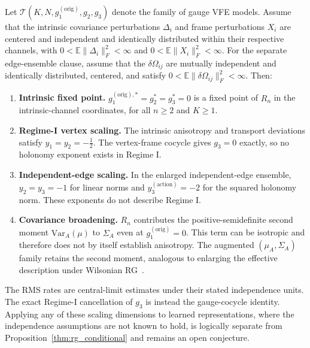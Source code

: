 \documentclass[twoside,11pt]{article}
\begin{document}
\begin{proposition}
\label{thm:rg_conditional}
Let $\mathcal{T}(K, N, g_1^{(\mathrm{orig})}, g_2, g_3)$ denote the family of gauge VFE models. Assume that the intrinsic covariance perturbations $\Delta_i$ and frame perturbations $X_i$ are centered and independent and identically distributed within their respective channels, with $0<\mathbb{E}\|\Delta_i\|_F^2<\infty$ and $0<\mathbb{E}\|X_i\|_F^2<\infty$. For the separate edge-ensemble clause, assume that the $\delta\Omega_{ij}$ are mutually independent and identically distributed, centered, and satisfy $0<\mathbb{E}\|\delta\Omega_{ij}\|_F^2<\infty$. Then:
\begin{enumerate}
\item[(i)] \textbf{Intrinsic fixed point.} $g_1^{(\mathrm{orig}),*} = g_2^* = g_3^* = 0$ is a fixed point of $R_n$ in the intrinsic-channel coordinates, for all $n \geq 2$ and $K \geq 1$.
\item[(ii)] \textbf{Regime-I vertex scaling.} The intrinsic anisotropy and transport deviations satisfy $y_1=y_2=-\tfrac{1}{2}$. The vertex-frame cocycle gives $g_3=0$ exactly, so no holonomy exponent exists in Regime I.
\item[(iii)] \textbf{Independent-edge scaling.} In the enlarged independent-edge ensemble, $y_2=y_3=-1$ for linear norms and $y_3^{(\mathrm{action})}=-2$ for the squared holonomy norm. These exponents do not describe Regime I.
\item[(iv)] \textbf{Covariance broadening.} $R_n$ contributes the positive-semidefinite second moment $\mathrm{Var}_A(\mu)$ to $\Sigma_A$ even at $g_1^{(\mathrm{orig})} = 0$. This term can be isotropic and therefore does not by itself establish anisotropy. The augmented $(\mu_A, \Sigma_A)$ family retains the second moment, analogous to enlarging the effective description under Wilsonian RG~\citep{Cardy1996}.
\end{enumerate}
\end{proposition}

The RMS rates are central-limit estimates under their stated independence units. The exact Regime-I cancellation of $g_3$ is instead the gauge-cocycle identity. Applying any of these scaling dimensions to learned representations, where the independence assumptions are not known to hold, is logically separate from Proposition~\ref{thm:rg_conditional} and remains an open conjecture.
\end{document}
